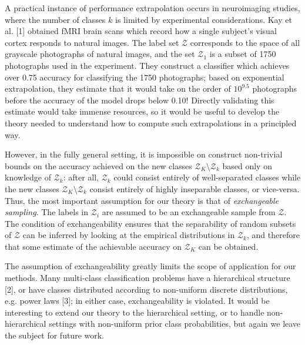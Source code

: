 \documentclass{article}
\begin{document}
A practical instance of performance extrapolation occurs in neuroimaging studies, where the number of classes $k$ is
limited by experimental considerations.
Kay et al. [1] obtained fMRI brain scans which record how a single subject's visual cortex responds to natural images.
The label set $\mathcal{Z}$ corresponds to the space of all grayscale photographs of natural images,
and the set $\mathcal{Z}_1$ is a subset of 1750 photographs used in the experiment.
They construct a classifier which achieves over 0.75 accuracy for classifying the 1750 photographs;
based on exponential extrapolation, they estimate that it would take on the order of $10^{9.5}$ photographs
before the accuracy of the model drops below 0.10!  Directly validating this estimate would take immense resources,
so it would be useful to develop the theory needed to understand how to compute such extrapolations
in a principled way. 

However, in the fully general setting, it is impossible on construct
non-trivial bounds on the accuracy achieved on the new classes $\mathcal{Z}_K \setminus \mathcal{Z}_k$
based only on knowledge of $\mathcal{Z}_k$: after all, $\mathcal{Z}_k$ could consist entirely of well-separated classes
while the new classes $\mathcal{Z}_K \setminus \mathcal{Z}_k$ consist entirely of highly inseparable classes, or vice-versa.
Thus, the most important assumption for our theory is that of \emph{exchangeable sampling}.
The labels in $\mathcal{Z}_i$ are assumed to be an exchangeable sample from $\mathcal{Z}$.
The condition of exchangeability ensures that the separability of random subsets of $\mathcal{Z}$ can be inferred
by looking at the empirical distributions in $\mathcal{Z}_k$, and therefore that some estimate of the achievable
accuracy on $\mathcal{Z}_K$ can be obtained.

The assumption of exchangeability greatly limits the scope of application for our methods.
Many multi-class classification problems
have a hierarchical structure [2], or have classes distributed according to
non-uniform discrete distributions, e.g. power laws [3]; in either case, exchangeability is violated.
It would be interesting to extend our theory to the hierarchical setting, or to handle non-hierarchical settings
with non-uniform prior class probabilities, but again we leave the subject for future work.
\end{document}

